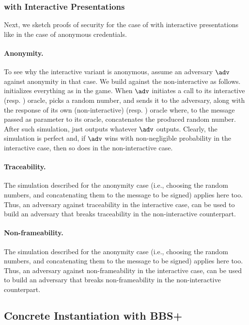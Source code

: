 \subsubsection{\GSAC with Interactive Presentations}
\label{ssap:interactive-gsac}

Next, we sketch proofs of security for the case of \GSAC with interactive
presentations like in the case of anonymous credentials.

\paragraph{Anonymity.} To see why the interactive variant is anonymous, assume
an adversary $\adv$ against anonymity in that case. We build \advB against the
non-interactive \ExpGSACAnonb as follows. \advB initializes everything as in the
\ExpGSACAnonb game. When $\adv$ initiates a call to its interactive \SIGN (resp.
\CHALb) oracle, \advB picks a random number, and sends it to the adversary,
along with the response of its own (non-interactive) \SIGN (resp. \CHALb)
oracle where, to the message passed as parameter to its oracle, concatenates the
produced random number. After such simulation, \advB just outputs whatever
$\adv$ outputs. Clearly, the simulation is perfect and, if $\adv$ wins with
non-negligible probability in the interactive case, then so does \advB in the
non-interactive case.

\paragraph{Traceability.} The simulation described for the anonymity case (i.e.,
\advB choosing the random numbers, and concatenating them to the message to be
signed) applies here too. Thus, an adversary against traceability in the
interactive case, can be used to build an adversary that breaks traceability in
the non-interactive counterpart.

\paragraph{Non-frameability.} The simulation described for the anonymity case
(i.e., \advB choosing the random numbers, and concatenating them to the message
to be signed) applies here too. Thus, an adversary against non-frameability in
the interactive case, can be used to build an adversary that breaks
non-frameability in the non-interactive counterpart. 

\subsection{Concrete Instantiation with BBS+}
\label{sapp:gsac-instantiation}

